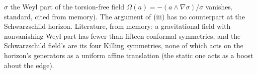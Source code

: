 $\sigma$ the Weyl part of the torsion-free field $\Omega(a) = -(a \wedge \nabla\sigma)/\sigma$ vanishes, standard, cited from memory). The argument of (iii) has no counterpart at the Schwarzschild horizon. Literature, from memory: a gravitational field with nonvanishing Weyl part has fewer than fifteen conformal symmetries, and the Schwarzschild field's are its four Killing symmetries, none of which acts on the horizon's generators as a uniform affine translation (the static one acts as a boost about the edge).
